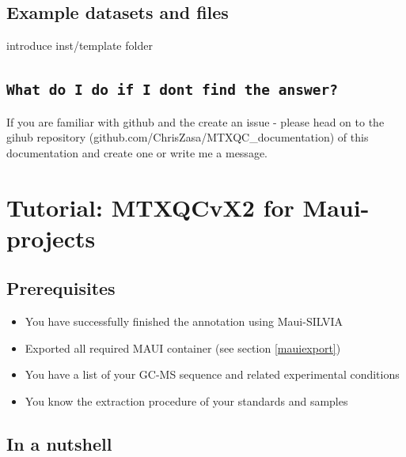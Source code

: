 \documentclass[]{book}
\providecommand{\tightlist}{%
  \setlength{\itemsep}{0pt}\setlength{\parskip}{0pt}}
\theoremstyle{definition}
\theoremstyle{definition}
\theoremstyle{definition}
\theoremstyle{remark}
\begin{document}
\section{Example datasets and files}\label{example-datasets-and-files}

introduce inst/template folder

\section{\texorpdfstring{\texttt{What\ do\ I\ do\ if\ I\ don\textquotesingle{}t\ find\ the\ answer?}}{What do I do if I don't find the answer?}}\label{what-do-i-do-if-i-dont-find-the-answer}

If you are familiar with github and the create an issue - please head on
to the gihub repository (github.com/ChrisZasa/MTXQC\_documentation) of
this documentation and create one or write me a message.

\chapter{Tutorial: MTXQCvX2 for Maui-projects}\label{maui}

\section{Prerequisites}\label{prerequisites}

\begin{itemize}
\tightlist
\item
  You have successfully finished the annotation using Maui-SILVIA
\item
  Exported all required MAUI container (see section \ref{mauiexport})
\item
  You have a list of your GC-MS sequence and related experimental
  conditions
\item
  You know the extraction procedure of your standards and samples
\end{itemize}

\section{In a nutshell}\label{nutshellmaui}
\end{document}
